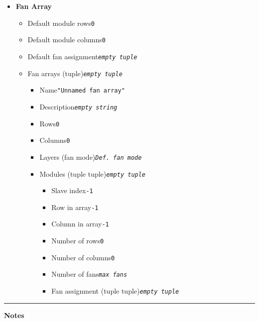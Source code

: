 \documentclass{article}
\newcommand{\dt}[1]{\dotfill \texttt{#1}}
\newcommand{\vp}{\vspace{1em}}
\newcommand{\et}{\textit{empty tuple}}
\newcommand{\es}{\textit{empty string}}
\begin{document}
\begin{multicols}{2}
\begin{itemize}
\item \textbf{Fan Array}

    \begin{itemize}

    \item Default module rows\dt{0}
    \item Default module columns\dt{0}
    \item Default fan assignment\dt{\et}
    \vp
    \item Fan arrays (tuple)\dt{\et}
    \begin{itemize}
        \item Name\dt{"Unnamed fan array"}
        \item Description\dt{\es}
        \item Rows\dt{0}
        \item Columns\dt{0}
        \item Layers (fan mode)\dt{\textit{Def. fan mode}}
        \item Modules (tuple tuple)\dt{\et}
            \begin{itemize}
                \item Slave index\dt{-1}
                \item Row in array\dt{-1}
                \item Column in array\dt{-1}
                \item Number of rows\dt{0}
                \item Number of columns\dt{0}
                \item Number of fans\dt{\textit{max fans}}
                \item Fan assignment (tuple tuple)\dt{\et}
            \end{itemize}
    \end{itemize}

    \end{itemize}

\end{itemize}

\end{multicols}
\vp
\hrule
\vp
\textbf{\large Notes}
\end{document}
